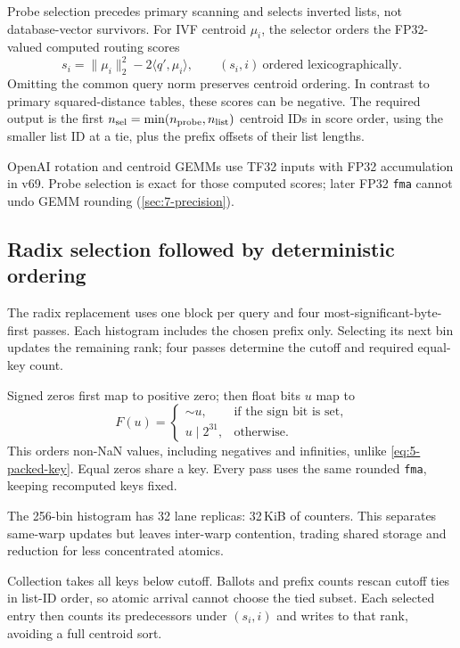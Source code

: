 Probe selection precedes primary scanning and selects inverted lists,
not database-vector survivors. For IVF centroid $\mu_i$, the selector
orders the FP32-valued computed routing scores
\begin{equation}
 s_i=\|\mu_i\|_2^2-2\langle q',\mu_i\rangle,
 \qquad (s_i,i)\ \text{ordered lexicographically}.
 \label{eq:5-probe-score}
\end{equation}
Omitting the common query norm preserves centroid ordering. In contrast
to primary squared-distance tables, these scores can be negative. The
required output is the first $n_{\rm sel}=\min(n_{\rm probe},n_{\rm list})$
centroid IDs in score order, using the smaller list ID at a tie, plus
the prefix offsets of their list lengths.

OpenAI rotation and centroid GEMMs use TF32 inputs with FP32 accumulation in v69. Probe selection is exact for those computed scores; later FP32 \texttt{fma} cannot undo GEMM rounding (\cref{sec:7-precision}).

\subsection{Radix selection followed by deterministic ordering}

The radix replacement uses one block per query and four most-significant-byte-first passes. Each histogram includes the chosen prefix only. Selecting its next bin updates the remaining rank; four passes determine the cutoff and required equal-key count.

Signed zeros first map to positive zero; then float bits $u$ map to
\begin{equation}
 F(u)=\begin{cases}
       \mathop{\sim}u,&\text{if the sign bit is set},\\
       u\mathbin{|}2^{31},&\text{otherwise}.
      \end{cases}
 \label{eq:5-probe-key}
\end{equation}
This orders non-NaN values, including negatives and infinities, unlike \cref{eq:5-packed-key}. Equal zeros share a key. Every pass uses the same rounded \texttt{fma}, keeping recomputed keys fixed.

The 256-bin histogram has 32 lane replicas: 32\,KiB of counters. This separates same-warp updates but leaves inter-warp contention, trading shared storage and reduction for less concentrated atomics.

Collection takes all keys below cutoff. Ballots and prefix counts rescan cutoff ties in list-ID order, so atomic arrival cannot choose the tied subset. Each selected entry then counts its predecessors under $(s_i,i)$ and writes to that rank, avoiding a full centroid sort.

